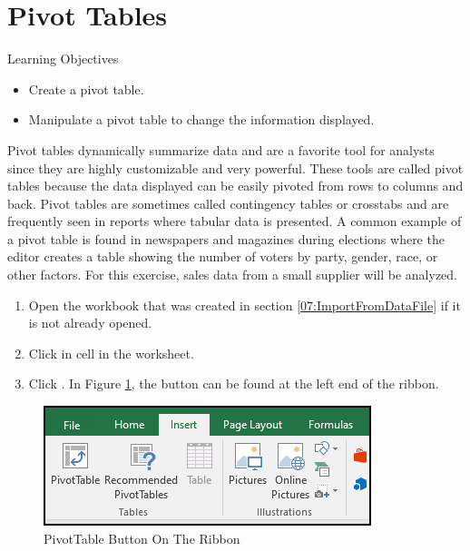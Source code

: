 \section{Pivot Tables}

\begin{center}
	\begin{objbox}{Learning Objectives}
		\begin{itemize}
			\setlength{\itemsep}{0pt}
			\setlength{\parskip}{0pt}
			\setlength{\parsep}{0pt}

			\item Create a pivot table.
			\item Manipulate a pivot table to change the information displayed.
			
		\end{itemize}
	\end{objbox}
\end{center}

Pivot tables dynamically summarize data and are a favorite tool for analysts since they are highly customizable and very powerful. These tools are called pivot tables because the data displayed can be easily pivoted from rows to columns and back. Pivot tables are sometimes called contingency tables or crosstabs and are frequently seen in reports where tabular data is presented. A common example of a pivot table is found in newspapers and magazines during elections where the editor creates a table showing the number of voters by party, gender, race, or other factors. For this exercise, sales data from a small supplier will be analyzed.

\begin{enumerate}
	\item Open the  workbook that was created in section \ref{07:ImportFromDataFile} if it is not already opened.
	\item Click in cell  in the  worksheet.
	\item Click . In Figure \ref{07:fig11}, the  button can be found at the left end of the ribbon.
\end{enumerate}

\begin{figure}[H]
	\centering
	\includegraphics[width=\maxwidth{.75\linewidth}]{gfx/ch07_fig11}
	\caption{PivotTable Button On The Ribbon}
	\label{07:fig11}
\end{figure}

